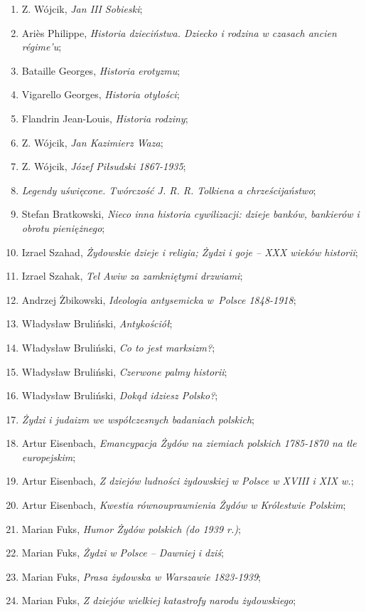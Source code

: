 \documentclass[a4paper,11pt]{article}
\begin{document}
\begin{enumerate}
\item Z. Wójcik, \emph{Jan III Sobieski};
\item Ariès Philippe, \emph{Historia dzieciństwa. Dziecko i rodzina w
    czasach ancien régime’u};
\item Bataille Georges, \emph{Historia erotyzmu};
\item Vigarello Georges, \emph{Historia otyłości};
\item Flandrin Jean-Louis, \emph{Historia rodziny};
\item Z. Wójcik, \emph{Jan Kazimierz Waza};
\item Z. Wójcik, \emph{Józef Piłsudski 1867-1935};
\item \emph{Legendy uświęcone. Twórczość J. R. R. Tolkiena a
    chrześcijaństwo};
\item Stefan Bratkowski, \emph{Nieco inna historia cywilizacji: dzieje
    banków, bankierów i obrotu pieniężnego};
\item Izrael Szahad, \emph{Żydowskie dzieje i religia; Żydzi i goje –
    XXX wieków historii};
\item Izrael Szahak, \emph{Tel Awiw za zamkniętymi drzwiami};
\item Andrzej Żbikowski, \emph{Ideologia antysemicka w~Polsce
    1848-1918};
\item Władysław Bruliński, \emph{Antykościół};
\item Władysław Bruliński, \emph{Co to jest marksizm?};
\item Władysław Bruliński, \emph{Czerwone palmy historii};
\item Władysław Bruliński, \emph{Dokąd idziesz Polsko?};
\item \emph{Żydzi i judaizm we współczesnych badaniach polskich};
\item Artur Eisenbach, \emph{Emancypacja Żydów na ziemiach polskich
    1785-1870 na tle europejskim};
\item Artur Eisenbach, \emph{Z dziejów ludności żydowskiej w Polsce w
    XVIII i XIX w.};
\item Artur Eisenbach, \emph{Kwestia równouprawnienia Żydów w
    Królestwie Polskim};
\item Marian Fuks, \emph{Humor Żydów polskich (do 1939 r.)};
\item Marian Fuks, \emph{Żydzi w Polsce – Dawniej i dziś};
\item Marian Fuks, \emph{Prasa żydowska w Warszawie 1823-1939};
\item Marian Fuks, \emph{Z dziejów wielkiej katastrofy narodu
    żydowskiego};

\end{enumerate}
\end{document}
